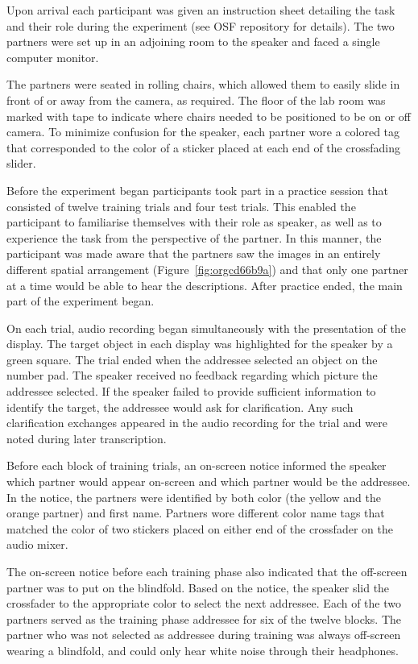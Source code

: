 \documentclass[natbib,doc,a4paper]{apa6}
\begin{document}
Upon arrival each participant was given an instruction sheet detailing the task and their role during the experiment (see OSF repository for details). The two partners were set up in an adjoining room to the speaker and faced a single computer monitor. 

The partners were seated in rolling chairs, which allowed them to easily slide in front of or away from the camera, as required. The floor of the lab room was marked with tape to indicate where chairs needed to be positioned to be on or off camera. To minimize confusion for the speaker, each partner wore a colored tag that corresponded to the color of a sticker placed at each end of the crossfading slider. 

Before the experiment began participants took part in a practice session that consisted of twelve training trials and four test trials.  This enabled the participant to familiarise themselves with their role as speaker, as well as to experience the task from the perspective of the partner. In this manner, the participant was made aware that the partners saw the images in an entirely different spatial arrangement (Figure~\ref{fig:orgcd66b9a}) and that only one partner at a time would be able to hear the descriptions. After practice ended, the main part of the experiment began.

On each trial, audio recording began simultaneously with the presentation of the display. The target object in each display was highlighted for the speaker by a green square. The trial ended when the addressee selected an object on the number pad. The speaker received no feedback regarding which picture the addressee selected. If the speaker failed to provide sufficient information to identify the target, the addressee would ask for clarification. Any such clarification exchanges appeared in the audio recording for the trial and were noted during later transcription.

Before each block of training trials, an on-screen notice informed the speaker which partner would appear on-screen and which partner would be the addressee. In the notice, the partners were identified by both color (the yellow and the orange partner) and first name. Partners wore different color name tags that matched the color of two stickers placed on either end of the crossfader on the audio mixer. 

The on-screen notice before each training phase also indicated that the off-screen partner was to put on the blindfold. Based on the notice, the speaker slid the crossfader to the appropriate color to select the next addressee.  Each of the two partners served as the training phase addressee for six of the twelve blocks.  The partner who was not selected as addressee during training was always off-screen wearing a blindfold, and could only hear white noise through their headphones.
\end{document}
